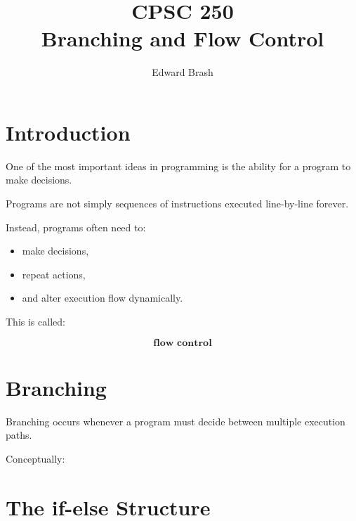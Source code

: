 \documentclass[11pt]{article}
\title{CPSC 250 \\ Branching and Flow Control}
\author{Edward Brash}
\date{}
\begin{document}
\maketitle

\section{Introduction}

One of the most important ideas in programming is the ability for a program to make decisions.

Programs are not simply sequences of instructions executed line-by-line forever.

Instead, programs often need to:

\begin{itemize}
    \item make decisions,
    \item repeat actions,
    \item and alter execution flow dynamically.
\end{itemize}

This is called:

\[
\textbf{flow control}
\]

\section{Branching}

Branching occurs whenever a program must decide between multiple execution paths.

Conceptually:

\begin{center}
\end{center}


\section{The if-else Structure}
\end{document}
